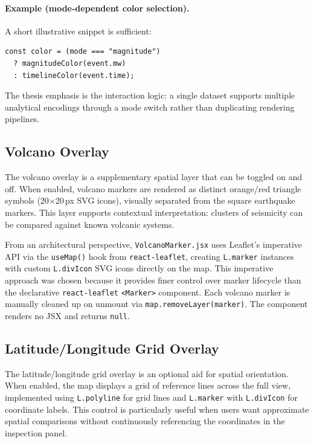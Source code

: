 \documentclass[12pt]{article}
\begin{document}
\paragraph{Example (mode-dependent color selection).}
A short illustrative snippet is sufficient:

\begin{verbatim}
const color = (mode === "magnitude")
  ? magnitudeColor(event.mw)
  : timelineColor(event.time);
\end{verbatim}

The thesis emphasis is the interaction logic: a single dataset supports multiple analytical encodings through a mode switch rather than duplicating rendering pipelines.

\subsection{Volcano Overlay}
\label{subsec:frontend_volcano}

The volcano overlay is a supplementary spatial layer that can be toggled on and off. When enabled, volcano markers are rendered as distinct orange/red triangle symbols (20$\times$20\,px SVG icons), visually separated from the square earthquake markers. This layer supports contextual interpretation: clusters of seismicity can be compared against known volcanic systems.

From an architectural perspective, \texttt{VolcanoMarker.jsx} uses Leaflet's imperative API via the \texttt{useMap()} hook from \texttt{react-leaflet}, creating \texttt{L.marker} instances with custom \texttt{L.divIcon} SVG icons directly on the map. This imperative approach was chosen because it provides finer control over marker lifecycle than the declarative \texttt{react-leaflet} \texttt{<Marker>} component. Each volcano marker is manually cleaned up on unmount via \texttt{map.removeLayer(marker)}. The component renders no JSX and returns \texttt{null}.

\subsection{Latitude/Longitude Grid Overlay}
\label{subsec:frontend_grid}

The latitude/longitude grid overlay is an optional aid for spatial orientation. When enabled, the map displays a grid of reference lines across the full view, implemented using \texttt{L.polyline} for grid lines and \texttt{L.marker} with \texttt{L.divIcon} for coordinate labels. This control is particularly useful when users want approximate spatial comparisons without continuously referencing the coordinates in the inspection panel.
\end{document}
